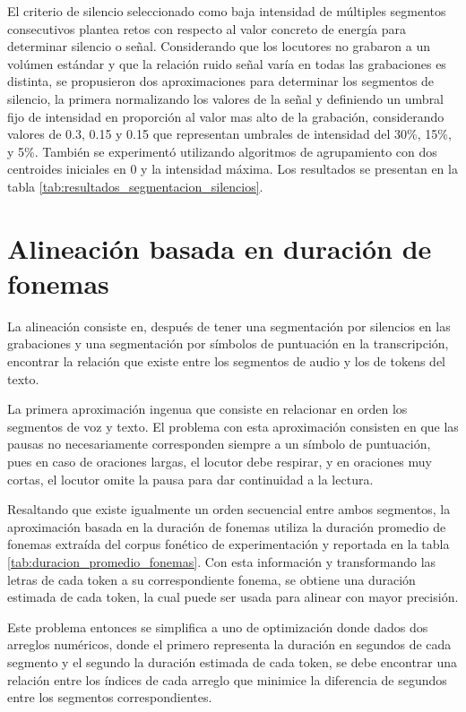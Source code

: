 El criterio de silencio seleccionado como baja intensidad de múltiples segmentos consecutivos plantea retos con respecto al valor concreto de energía para determinar silencio o señal. Considerando que los locutores no grabaron a un volúmen estándar y que la relación ruido señal varía en todas las grabaciones es distinta, se propusieron dos aproximaciones para determinar los segmentos de silencio, la primera normalizando los valores de la señal y definiendo un umbral fijo de intensidad en proporción al valor mas alto de la grabación, considerando valores de 0.3, 0.15 y 0.15 que representan umbrales de intensidad del 30\%, 15\%, y 5\%. También se experimentó utilizando algoritmos de agrupamiento con dos centroides iniciales en 0 y la intensidad máxima. Los resultados se presentan en la tabla \ref{tab:resultados_segmentacion_silencios}.




\section{Alineación basada en duración de fonemas}

La alineación consiste en, después de tener una segmentación por silencios en las grabaciones y una segmentación por símbolos de puntuación en la transcripción, encontrar la relación que existe entre los segmentos de audio y los de tokens del texto.

La primera aproximación ingenua que consiste en relacionar en orden los segmentos de voz y texto. El problema con esta aproximación consisten en que las pausas no necesariamente corresponden siempre a un símbolo de puntuación, pues en caso de oraciones largas, el locutor debe respirar, y en oraciones muy cortas, el locutor omite la pausa para dar continuidad a la lectura.

Resaltando que existe igualmente un orden secuencial entre ambos segmentos, la aproximación basada en la duración de fonemas utiliza la duración promedio de fonemas extraída del corpus fonético de experimentación y reportada en la tabla \ref{tab:duracion_promedio_fonemas}. Con esta información y transformando las letras de cada token a su correspondiente fonema, se obtiene una duración estimada de cada token, la cual puede ser usada para alinear con mayor precisión.




Este problema entonces se simplifica a uno de optimización donde dados dos arreglos numéricos, donde el primero representa la duración en segundos de cada segmento y el segundo la duración estimada de cada token, se debe encontrar una relación entre los índices de cada arreglo que minimice la diferencia de segundos entre los segmentos correspondientes.

